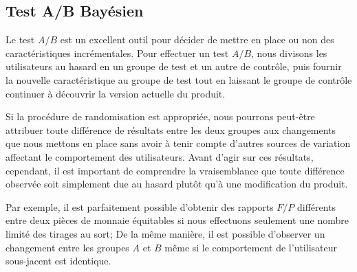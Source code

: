 \subsection{Test A/B Bay\'esien}
Le test $A/B$ est un excellent outil pour d\'ecider de mettre en place ou non des caract\'eristiques incr\'ementales. Pour effectuer un test $A/B$, nous divisons les utilisateurs au hasard en un groupe de test et un autre de contrôle, puis fournir la nouvelle caract\'eristique au groupe de test tout en laissant le groupe de contrôle continuer \`a d\'ecouvrir la version actuelle du produit. \par Si la proc\'edure de randomisation est appropri\'ee, nous pourrons peut-être attribuer toute diff\'erence de r\'esultats entre les deux groupes aux changements que nous mettons en place sans avoir \`a tenir compte d'autres sources de variation affectant le comportement des utilisateurs. Avant d'agir sur ces r\'esultats, cependant, il est important de comprendre la vraisemblance que toute diff\'erence observ\'ee soit simplement due au hasard plutôt qu'\`a une modification du produit. \par Par exemple, il est parfaitement possible d'obtenir des rapports $F/P$ diff\'erents entre deux pi\`eces de monnaie \'equitables si nous effectuons seulement une nombre limit\'e des tirages au sort; De la même mani\`ere, il est possible d'observer un changement entre les groupes $A$ et $B$ même si le comportement de l'utilisateur sous-jacent est identique.
